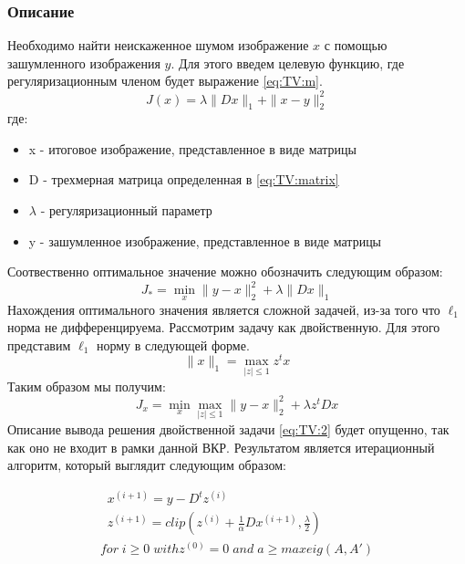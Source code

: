 \subsubsection{Описание}
Необходимо найти неискаженное шумом изображение $x$ с помощью зашумленного изображения $y$. Для этого введем целевую функцию, где регуляризационным членом будет выражение \ref{eq:TV:m}.
\begin{equation}
J(x) = \lambda \parallel D x \parallel_1+\parallel x-y\parallel_2^2
\end{equation}
где:
\begin{itemize}
	\item x - итоговое изображение, представленное в виде матрицы
	\item D - трехмерная матрица определенная в \ref{eq:TV:matrix}
	\item $\lambda$ - регуляризационный параметр 
	\item y - зашумленное изображение, представленное в виде матрицы 
\end{itemize}
Соотвественно оптимальное значение можно обозначить следующим образом:
\begin{equation}
J_* = \min_x \parallel y-x\parallel^2_2 + \lambda\parallel Dx\parallel_1
\end{equation}
Нахождения оптимального значения является сложной задачей, из-за того что $\ell_1$ норма не дифференцируема. Рассмотрим задачу как двойственную.
Для этого представим $\ell_1$ норму в следующей форме.
\begin{equation}
	\parallel x \parallel_1 = \max_{|z| \le 1}z^tx
\end{equation}
Таким образом мы получим:
\begin{equation}\label{eq:TV:2}
	J_x=\min_x\max_{|z| \le 1}\parallel y-x \parallel_2^2+\lambda z^t Dx
\end{equation}
Описание вывода решения двойственной задачи \ref{eq:TV:2} будет опущенно, так как оно не входит в рамки данной ВКР. Результатом является итерационный алгоритм, который выглядит следующим образом:
\begin{fleqns}
\begin{gather*}
\;\;x^{(i+1)}=y-D^tz^{(i)} \\
\;\;z^{(i+1)}=clip(z^{(i)} + \frac{1}{\alpha}Dx^{(i+1)}, \frac{\lambda}{2})\\
for  \;i \ge 0 \; with z^{(0)}=0\; and\;a\ge maxeig(A,A')
\end{gather*}
\end{fleqns}


